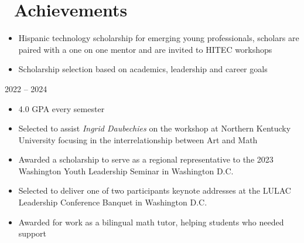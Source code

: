 \documentclass{resume}
\begin{document}
\section{\faCertificate\ Achievements}
\begin{itemize}
    \item Hispanic technology scholarship for emerging young professionals, scholars are paired with a one on one mentor and are invited to HITEC workshops
\end{itemize}
\vspace{0.2em}
\begin{itemize}
    \item Scholarship selection based on academics, leadership and career goals
\end{itemize}
\vspace{0.2em}
 {2022 -- 2024}
\begin{itemize}
    \item 4.0 GPA every semester
\end{itemize}
\vspace{0.2em}
\begin{itemize}
    \item Selected to assist \textit{Ingrid Daubechies} on the workshop at Northern Kentucky University focusing in the interrelationship between Art and Math
\end{itemize}
\vspace{0.2em}
\begin{itemize}[parsep=0.5ex]
    \item Awarded a scholarship to serve as a regional representative to the 2023 Washington Youth Leadership Seminar in Washington D.C.
    \item Selected to deliver one of two participants keynote addresses at the LULAC Leadership Conference Banquet in Washington D.C.
\end{itemize}
\vspace{0.2em}
\begin{itemize}
    \item Awarded for work as a bilingual math tutor, helping students who needed support
\end{itemize}
\end{document}
